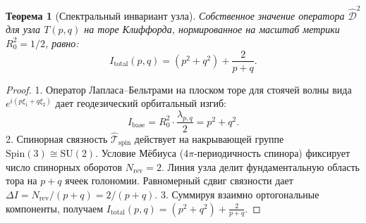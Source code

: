 \documentclass[11pt,a4paper]{article}
\newtheorem{theorem}{Теорема}
\theoremstyle{definition}
\theoremstyle{remark}
\begin{document}
\begin{theorem}[Спектральный инвариант узла]
\label{thm:knot_invariant}
Собственное значение оператора $\hat{\mathcal{D}}^2$ для узла $T(p,q)$ на торе Клиффорда, нормированное на масштаб метрики $R_0^2 = 1/2$, равно:
\begin{equation}
    I_{\mathrm{total}}(p, q) = (p^2 + q^2) + \frac{2}{p + q}.
\end{equation}
\end{theorem}
\begin{proof}
1. Оператор Лапласа--Бельтрами на плоском торе для стоячей волны вида $e^{i(p\xi_1 + q\xi_2)}$ дает геодезический орбитальный изгиб:
\begin{equation}
    I_{\mathrm{base}} = R_0^2 \cdot \frac{\lambda_{p,q}}{2} = p^2 + q^2.
\end{equation}
2. Спинорная связность $\hat{\mathcal{T}}_{\mathrm{spin}}$ действует на накрывающей группе $\mathrm{Spin}(3) \cong \mathrm{SU}(2)$. Условие Мёбиуса ($4\pi$-периодичность спинора) фиксирует число спинорных оборотов $N_{\mathrm{rev}} = 2$. Линия узла делит фундаментальную область тора на $p+q$ ячеек голономии. Равномерный сдвиг связности дает $\Delta I = N_{\mathrm{rev}} / (p+q) = 2/(p+q)$.
3. Суммируя взаимно ортогональные компоненты, получаем $I_{\mathrm{total}}(p, q) = (p^2 + q^2) + \frac{2}{p+q}$.
\end{proof}
\end{document}
